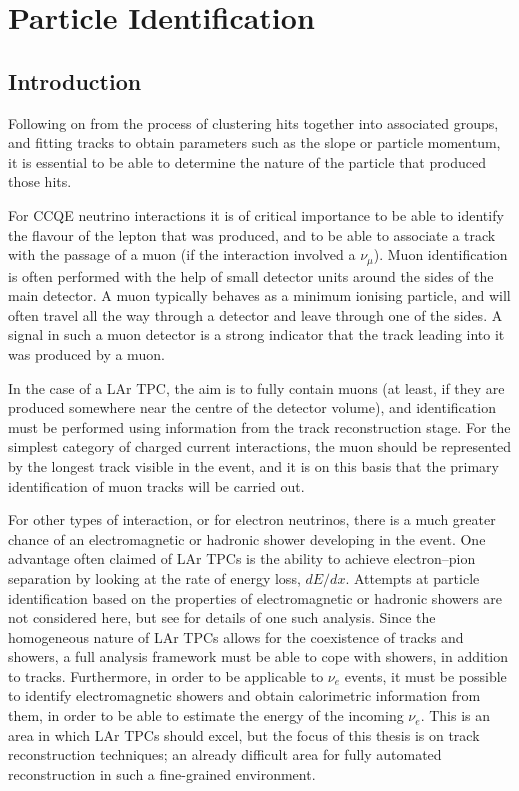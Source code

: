 \chapter{Particle Identification}

\section{Introduction}
Following on from the process of clustering hits together into associated groups, and fitting tracks to obtain parameters such as the slope or particle momentum, it is essential to be able to determine the nature of the particle that produced those hits.

For \ac{CCQE} neutrino interactions it is of critical importance to be able to identify the flavour of the lepton that was produced, and to be able to associate a track with the passage of a muon (if the interaction involved a $\nu_\mu$). Muon identification is often performed with the help of small detector units around the sides of the main detector. A muon typically behaves as a minimum ionising particle, and will often travel all the way through a detector and leave through one of the sides. A signal in such a muon detector is a strong indicator that the track leading into it was produced by a muon.

In the case of a \ac{LAr TPC}, the aim is to fully contain muons (at least, if they are produced somewhere near the centre of the detector volume), and identification must be performed using information from the track reconstruction stage. For the simplest category of charged current interactions, the muon should be represented by the longest track visible in the event, and it is on this basis that the primary identification of muon tracks will be carried out.

For other types of interaction, or for electron neutrinos, there is a much greater chance of an electromagnetic or hadronic shower developing in the event. One advantage often claimed of LAr TPCs is the ability to achieve electron--pion separation by looking at the rate of energy loss, $dE/dx$. Attempts at particle identification based on the properties of electromagnetic or hadronic showers are not considered here, but see \citep{Ramachers2012} for details of one such analysis. Since the homogeneous nature of LAr TPCs allows for the coexistence of tracks and showers, a full analysis framework must be able to cope with showers, in addition to tracks. Furthermore, in order to be applicable to $\nu_e$ events, it must be possible to identify electromagnetic showers and obtain calorimetric information from them, in order to be able to estimate the energy of the incoming $\nu_e$. This is an area in which LAr TPCs should excel, but the focus of this thesis is on track reconstruction techniques; an already difficult area for fully automated reconstruction in such a fine-grained environment.

